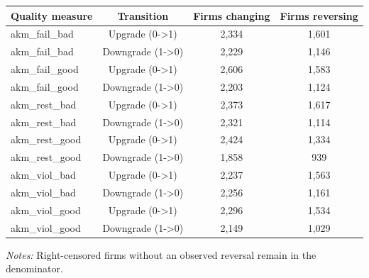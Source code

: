 \documentclass[10pt]{article}
\begin{document}
\begin{minipage}{19cm}\fontsize{10}{12}\selectfont\setlength{\tabcolsep}{4pt}\renewcommand{\arraystretch}{1.12}


\centering
{}
\begin{threeparttable}
\begin{tabular}{p{}ccc}
\toprule
Quality measure & Transition & Firms changing & Firms reversing \\
\midrule
akm\_fail\_bad & Upgrade (0->1) & 2,334 & 1,601 \\
akm\_fail\_bad & Downgrade (1->0) & 2,229 & 1,146 \\
akm\_fail\_good & Upgrade (0->1) & 2,606 & 1,583 \\
akm\_fail\_good & Downgrade (1->0) & 2,203 & 1,124 \\
akm\_rest\_bad & Upgrade (0->1) & 2,373 & 1,617 \\
akm\_rest\_bad & Downgrade (1->0) & 2,321 & 1,114 \\
akm\_rest\_good & Upgrade (0->1) & 2,424 & 1,334 \\
akm\_rest\_good & Downgrade (1->0) & 1,858 & 939 \\
akm\_viol\_bad & Upgrade (0->1) & 2,237 & 1,563 \\
akm\_viol\_bad & Downgrade (1->0) & 2,256 & 1,161 \\
akm\_viol\_good & Upgrade (0->1) & 2,296 & 1,534 \\
akm\_viol\_good & Downgrade (1->0) & 2,149 & 1,029 \\
\bottomrule
\end{tabular}
\begin{tablenotes}\fontsize{9}{11}\selectfont
\item \raggedright \fontsize{9}{11}\selectfont \textit{Notes:} Right-censored firms without an observed reversal remain in the denominator.
\end{tablenotes}
\end{threeparttable}

\end{minipage}
\end{document}
